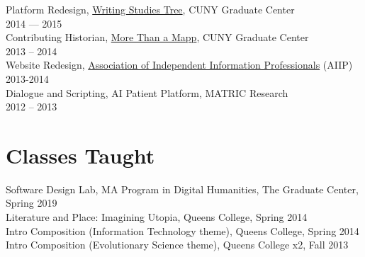 \documentclass[11pt]{article}
\begin{document}
Platform Redesign, \href{http://www.writingstudiestree.org/}{Writing Studies Tree}, CUNY Graduate Center\\
2014 — 2015\\

Contributing Historian, \href{http://www.morethanamapp.org/}{More Than a Mapp}, CUNY Graduate Center\\
2013 – 2014\\

Website Redesign, \href{http://www.aiip.org/}{Association of Independent Information Professionals} (AIIP)\\
2013-2014\\

Dialogue and Scripting, AI Patient Platform, MATRIC Research\\
2012 – 2013\\

\section*{Classes Taught}
\label{sec:orgheadline10}

Software Design Lab, MA Program in Digital Humanities, The Graduate Center, Spring 2019\\
Literature and Place: Imagining Utopia, Queens College, Spring 2014\\
Intro Composition (Information Technology theme), Queens College, Spring 2014\\
Intro Composition (Evolutionary Science theme), Queens College  x2, Fall 2013\\
\end{document}
